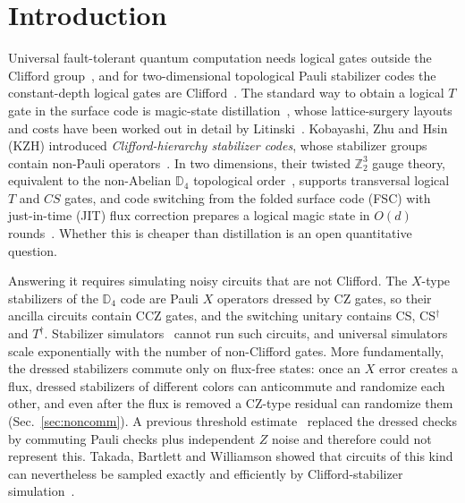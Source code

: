 \documentclass[a4paper]{article}
\begin{document}

\maketitle

\section{Introduction}
\label{sec:intro}

Universal fault-tolerant quantum computation needs logical gates outside the Clifford group~\cite{eastin-knill2009}, and for two-dimensional topological Pauli stabilizer codes the constant-depth logical gates are Clifford~\cite{bravyikonig2013}. The standard way to obtain a logical $T$ gate in the surface code is magic-state distillation~\cite{bravyikitaev2005}, whose lattice-surgery layouts and costs have been worked out in detail by Litinski~\cite{litinski2019game,litinski2019magic}. Kobayashi, Zhu and Hsin (KZH) introduced \emph{Clifford-hierarchy stabilizer codes}, whose stabilizer groups contain non-Pauli operators~\cite{kobayashi2025clifford}. In two dimensions, their twisted $\mathbb{Z}_2^3$ gauge theory, equivalent to the non-Abelian $\mathbb{D}_4$ topological order~\cite{iqbal2024nonabelian}, supports transversal logical $T$ and $CS$ gates, and code switching from the folded surface code (FSC) with just-in-time (JIT) flux correction prepares a logical magic state in $O(d)$ rounds~\cite{kobayashi2025clifford,davydova2025knots}. Whether this is cheaper than distillation is an open quantitative question.

Answering it requires simulating noisy circuits that are not Clifford. The $X$-type stabilizers of the $\mathbb{D}_4$ code are Pauli $X$ operators dressed by CZ gates, so their ancilla circuits contain CCZ gates, and the switching unitary contains CS, CS$^\dagger$ and $T^\dagger$. Stabilizer simulators~\cite{gidney2021stim,gottesmanknill1998} cannot run such circuits, and universal simulators~\cite{haenel2026tsim} scale exponentially with the number of non-Clifford gates. More fundamentally, the dressed stabilizers commute only on flux-free states: once an $X$ error creates a flux, dressed stabilizers of different colors can anticommute and randomize each other, and even after the flux is removed a CZ-type residual can randomize them (Sec.~\ref{sec:noncomm}). A previous threshold estimate~\cite{haga2026aqis} replaced the dressed checks by commuting Pauli checks plus independent $Z$ noise and therefore could not represent this. Takada, Bartlett and Williamson showed that circuits of this kind can nevertheless be sampled exactly and efficiently by Clifford-stabilizer simulation~\cite{takada2026exact}.
\end{document}
